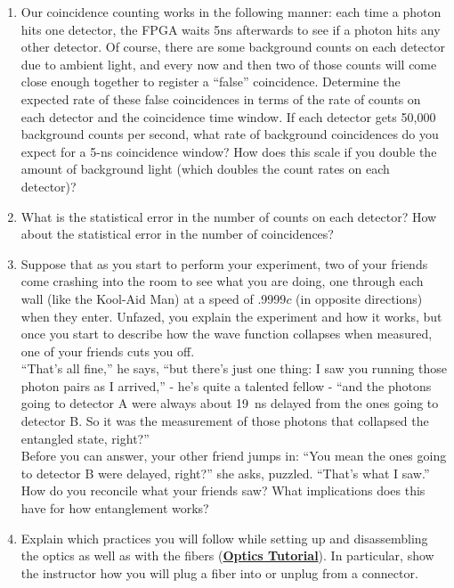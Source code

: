 \documentclass{../signatures}
\begin{document}
\begin{enumerate}
    \item Our coincidence counting works in the following manner: each time a photon hits one detector, the FPGA waits 5ns afterwards to see if a photon hits any other detector. Of course, there are some background counts on each detector due to ambient light, and every now and then two of those counts will come close enough together to register a ``false'' coincidence. Determine the expected rate of these false coincidences in terms of the rate of counts on each detector and the coincidence time window. If each detector gets 50,000 background counts per second, what rate of background coincidences do you expect for a 5-ns coincidence window? How does this scale if you double the amount of background light (which doubles the count rates on each detector)?

    \item What is the statistical error in the number of counts on each detector? How about the statistical error in the number of coincidences?

    \item Suppose that as you start to perform your experiment, two of your friends come crashing into the room to see what you are doing, one through each wall (like the Kool-Aid Man) at a speed of .9999$c$ (in opposite directions) when they enter. Unfazed, you explain the experiment and how it works, but once you start to describe how the wave function collapses when measured, one of your friends cuts you off.
    \\``That's all fine,'' he says, ``but there's just one thing: I saw you running those photon pairs as I arrived,'' - he's quite a talented fellow - ``and the photons going to detector A were always about 19~ns delayed from the ones going to detector B. So it was the measurement of those photons that collapsed the entangled state, right?''\\
    Before you can answer, your other friend jumps in: ``You mean the ones going to detector B were delayed, right?'' she asks, puzzled. ``That's what I saw.''\\
    How do you reconcile what your friends saw? What implications does this have for how entanglement works?

    \item Explain which practices you will follow while setting up and disassembling the optics as well as with the fibers (\href{http://experimentationlab.berkeley.edu/OpticsTutorial}{\textbf{Optics Tutorial}}). In particular, show the instructor how you will plug a fiber into or unplug from a connector.
    \\[32pt]
\end{enumerate}
\end{document}

